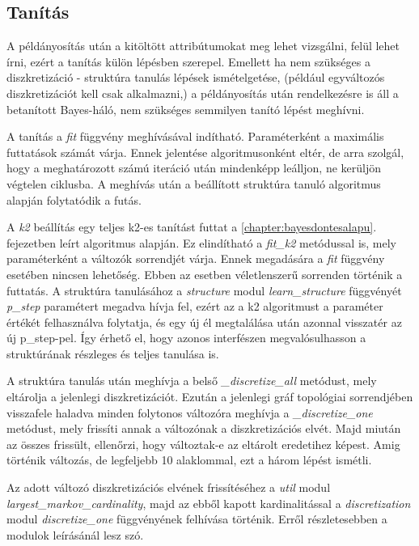 \subsection{Tanítás}
A példányosítás után a kitöltött attribútumokat meg lehet vizsgálni, felül lehet írni, ezért a tanítás külön lépésben szerepel. Emellett ha nem szükséges a diszkretizáció - struktúra tanulás lépések ismételgetése, (például egyváltozós diszkretizációt kell csak alkalmazni,) a példányosítás után rendelkezésre is áll a betanított Bayes-háló, nem szükséges semmilyen tanító lépést meghívni.

A tanítás a \emph{fit} függvény meghívásával indítható. Paraméterként a maximális futtatások számát várja. Ennek jelentése algoritmusonként eltér, de arra szolgál, hogy a meghatározott számú iteráció után mindenképp leálljon, ne kerüljön végtelen ciklusba. A meghívás után a beállított struktúra tanuló algoritmus alapján folytatódik a futás.

A \emph{k2} beállítás egy teljes k2-es tanítást futtat a \ref{chapter:bayesdontesalapu}. fejezetben leírt algoritmus alapján. Ez elindítható a \emph{fit\_k2} metódussal is, mely paraméterként a változók sorrendjét várja. Ennek megadására a \emph{fit} függvény esetében nincsen lehetőség. Ebben az esetben véletlenszerű sorrenden történik a futtatás. A struktúra tanulásához a \emph{structure} modul \emph{learn\_structure} függvényét \emph{p\_step} paramétert megadva hívja fel, ezért az a k2 algoritmust a paraméter értékét felhasználva folytatja, és egy új él megtalálása után azonnal visszatér az új p\_step-pel. Így érhető el, hogy azonos interfészen megvalósulhasson a struktúrának részleges és teljes tanulása is.

A struktúra tanulás után meghívja a belső \emph{\_discretize\_all} metódust, mely eltárolja a jelenlegi diszkretizációt. Ezután a jelenlegi gráf topológiai sorrendjében visszafele haladva minden folytonos változóra meghívja a \emph{\_discretize\_one} metódust, mely frissíti annak a változónak a diszkretizációs elvét. Majd miután az összes frissült, ellenőrzi, hogy változtak-e az eltárolt eredetihez képest. Amig történik változás, de legfeljebb 10 alaklommal, ezt a három lépést ismétli.

Az adott változó diszkretizációs elvének frissítéséhez a \emph{util} modul \emph{largest\_markov\_cardinality}, majd az ebből kapott kardinalitással a \emph{discretization} modul \emph{discretize\_one} függvényének felhívása történik. Erről részletesebben a modulok leírásánál lesz szó.

